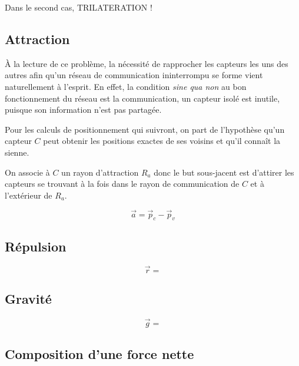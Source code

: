 \documentclass[10pt]{article}
\begin{document}
\begin{multicols}{2}
Dans le second cas, TRILATERATION !

\subsection{Attraction}

\`A la lecture de ce problème, la nécessité de rapprocher les capteurs
les uns des autres afin qu'un réseau de communication ininterrompu se
forme vient naturellement à l'esprit. En effet, la condition
\textit{sine qua non} au bon fonctionnement du réseau est la
communication, un capteur isolé est inutile, puisque son information
n'est pas partagée.

Pour les calculs de positionnement qui suivront, on part de
l'hypothèse qu'un capteur $C$ peut obtenir les positions exactes de
ses voisins et qu'il connaît la sienne.

On associe à $C$ un rayon d'attraction $R_a$ donc le but sous-jacent
est d'attirer les capteurs se trouvant à la fois dans le rayon de
communication de $C$ et à l'extérieur de $R_a$.

\begin{figure}[H]

  \centering

  

  \caption{}
  \label{}

\end{figure}

$$
\vec{a} = \vec{p}_c - \vec{p}_v
$$

\subsection{Répulsion}

\begin{figure}[H]

  \centering

  

  \caption{}
  \label{}

\end{figure}

$$
\vec{r} =
$$

\subsection{Gravité}

\begin{figure}[H]

  \centering

  

  \caption{}
  \label{}

\end{figure}

$$
\vec{g} =
$$

\subsection{Composition d'une force nette}


\end{multicols}



\end{document}
